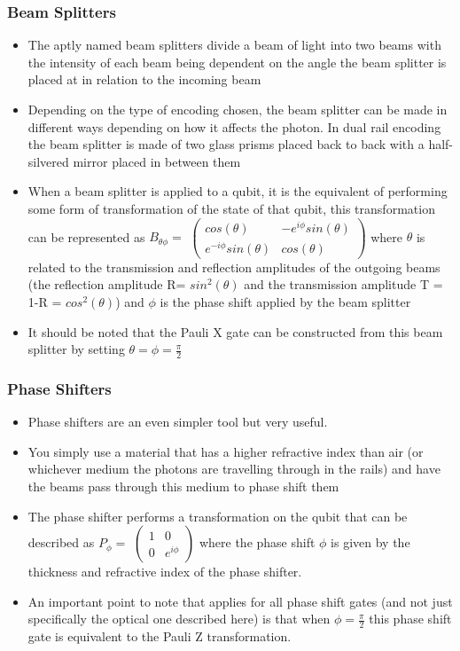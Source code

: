\subsubsection{Beam Splitters}
\begin{itemize}
    \item The aptly named beam splitters divide a beam of light into two beams with the intensity of each beam being dependent on the angle the beam splitter is placed at in relation to the incoming beam
    \item Depending on the type of encoding  chosen, the beam splitter can be made in different ways depending on how it affects the photon. In dual rail encoding the beam splitter is made of two glass prisms placed back to back with a half-silvered mirror placed in between them %
    \item When a beam splitter is applied to a qubit, it is the equivalent of performing some form of transformation of the state of that qubit, this transformation can be represented as $B_{\theta\phi} = $ $\begin{pmatrix}
    cos(\theta) & -e^{i\phi}sin(\theta) \\
    e^{-i\phi}sin(\theta) & cos(\theta) 
    \end{pmatrix}$ where $\theta$ is related to the transmission and reflection amplitudes of the outgoing beams (the reflection amplitude R= $sin^2(\theta)$ and the transmission amplitude T = 1-R = $cos^2(\theta)$) and $\phi$ is the phase shift applied by the beam splitter
    \item It should be noted that the Pauli X gate can be constructed from this beam splitter by setting $\theta = \phi = \frac{\pi}{2}$
    
\end{itemize}
\subsubsection{Phase Shifters}
\begin{itemize}
    \item Phase shifters are an even simpler tool but very useful.
    \item You simply use a material that has a higher refractive index than air (or whichever medium the photons are travelling through in the rails) and have the beams pass through this medium to phase shift them
    \item The phase shifter performs a transformation on the qubit that can be described as $P_\phi = $ $\begin{pmatrix}
    1 & 0 \\
    0 & e^{i\phi}
    \end{pmatrix}$ where the phase shift $\phi$ is given by the thickness and refractive index of the phase shifter.
    \item An important point to note that applies for all phase shift gates (and not just specifically the optical one described here) is that when $\phi = \frac{\pi}{2}$ this phase shift gate is equivalent to the Pauli Z transformation.
\end{itemize}
